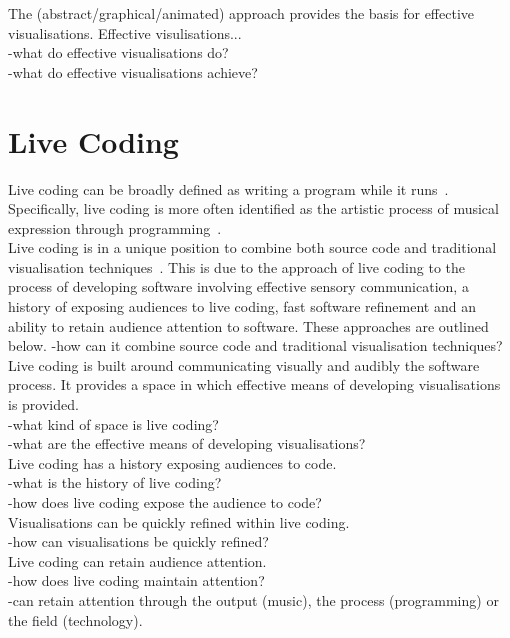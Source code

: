 The (abstract/graphical/animated) approach provides the basis for effective visualisations. Effective visulisations...\\
-what do effective visualisations do?\\
-what do effective visualisations achieve?\\


\section{Live Coding}

Live coding can be broadly defined as writing a program while it runs~\cite{Ward2004}. Specifically, live coding is more often identified as the artistic process of musical expression through programming~\cite{Collins2003}.\\

Live coding is in a unique position to combine both source code and traditional visualisation techniques~\cite{McLean2010a}. This is due to the approach of live coding to the process of developing software involving effective sensory communication, a history of exposing audiences to live coding, fast software refinement and an ability to retain audience attention to software. These approaches are outlined below.
-how can it combine source code and traditional visualisation techniques?\\

Live coding is built around communicating visually and audibly the software process. It provides a space in which effective means of developing visualisations is provided. \\
-what kind of space is live coding?\\
-what are the effective means of developing visualisations?\\

Live coding has a history exposing audiences to code.\\
-what is the history of live coding?\\
-how does live coding expose the audience to code?\\

Visualisations can be quickly refined within live coding.\\
-how can visualisations be quickly refined?\\

Live coding can retain audience attention.\\
-how does live coding maintain attention?\\
-can retain attention through the output (music), the process (programming) or the field (technology).\\


